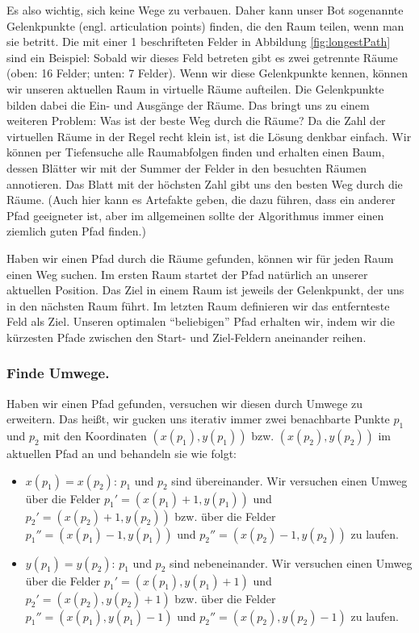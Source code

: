 Es also wichtig, sich keine Wege zu verbauen.
Daher kann unser Bot sogenannte Gelenkpunkte (engl. articulation points) finden, die den Raum teilen, wenn man sie betritt.
Die mit einer 1 beschrifteten Felder in Abbildung \ref{fig:longestPath} sind ein Beispiel: Sobald wir dieses Feld betreten gibt es zwei getrennte Räume (oben: 16 Felder; unten: 7 Felder).
Wenn wir diese Gelenkpunkte kennen, können wir unseren aktuellen Raum in virtuelle Räume aufteilen.
Die Gelenkpunkte bilden dabei die Ein- und Ausgänge der Räume.
Das bringt uns zu einem weiteren Problem: Was ist der beste Weg durch die Räume?
Da die Zahl der virtuellen Räume in der Regel recht klein ist, ist die Lösung denkbar einfach.
Wir können per Tiefensuche alle Raumabfolgen finden und erhalten einen Baum, dessen Blätter wir mit der Summer der Felder in den besuchten Räumen annotieren.
Das Blatt mit der höchsten Zahl gibt uns den besten Weg durch die Räume.
(Auch hier kann es Artefakte geben, die dazu führen, dass ein anderer Pfad geeigneter ist, aber im allgemeinen sollte der Algorithmus immer einen ziemlich guten Pfad finden.)

Haben wir einen Pfad durch die Räume gefunden, können wir für jeden Raum einen Weg suchen.
Im ersten Raum startet der Pfad natürlich an unserer aktuellen Position.
Das Ziel in einem Raum ist jeweils der Gelenkpunkt, der uns in den nächsten Raum führt.
Im letzten Raum definieren wir das entfernteste Feld als Ziel.
Unseren optimalen ``beliebigen'' Pfad erhalten wir, indem wir die kürzesten Pfade zwischen den Start- und Ziel-Feldern aneinander reihen.


\subsubsection{Finde Umwege.}
\label{sec:umwege}
Haben wir einen Pfad gefunden, versuchen wir diesen durch Umwege zu erweitern.
Das heißt, wir gucken uns iterativ immer zwei benachbarte Punkte $p_1$ und $p_2$ mit den Koordinaten $(x(p_1), y(p_1))$ bzw. $(x(p_2), y(p_2))$ im aktuellen Pfad an und behandeln sie wie folgt:

\begin{itemize}
 \item $x(p_1) = x(p_2)$: $p_1$ und $p_2$ sind übereinander. Wir versuchen einen Umweg über die Felder  $p_1'=(x(p_1) + 1, y(p_1))$ und $p_2'=(x(p_2) + 1, y(p_2))$ bzw. über die Felder $p_1''=(x(p_1) - 1, y(p_1))$ und $p_2''=(x(p_2) - 1, y(p_2))$ zu laufen.
 \item $y(p_1) = y(p_2)$: $p_1$ und $p_2$ sind nebeneinander. Wir versuchen einen Umweg über die Felder  $p_1'=(x(p_1), y(p_1) + 1)$ und $p_2'=(x(p_2), y(p_2) + 1)$ bzw. über die Felder $p_1''=(x(p_1), y(p_1) - 1)$ und $p_2''=(x(p_2), y(p_2) - 1)$ zu laufen.
\end{itemize}

